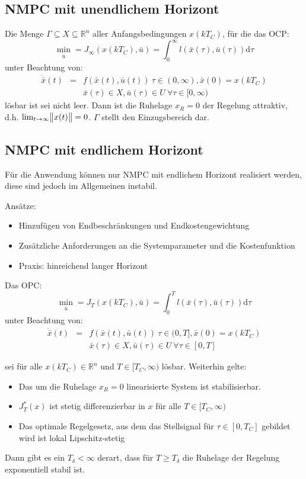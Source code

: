 \subsection{NMPC mit unendlichem Horizont}
Die Menge $\Gamma \subseteq X \subseteq \mathbb{R}^n$ aller Anfangsbedingungen $x(kT_C)$,
für die das OCP:
\begin{equation}
    \min_{\bar{u}} = J_\infty(x(k T_C), \bar{u}) = \int_0^\infty l(\bar{x}(\tau), \bar{u}(\tau)) \text{d}\tau
\end{equation}
unter Beachtung von:
\begin{eqnarray}
    \dot{\bar{x}}(t) &=& f(\bar{x}(t), \bar{u}(t))\ \tau \in (0, \infty), \bar{x}(0)=x(k T_C) \\
    &&\bar{x}(\tau) \in X, \bar{u}(\tau) \in U\ \forall \tau \in [0, \infty)
\end{eqnarray}
lösbar ist sei nicht leer. Dann ist die Ruhelage $x_R=0$ der Regelung attraktiv, d.h.
$\lim_{t \to \infty} \norm{x(t)} = 0$. $\Gamma$ stellt den Einzugsbereich dar.

\subsection{NMPC mit endlichem Horizont}
Für die Anwendung können nur NMPC mit endlichem Horizont realisiert werden, diese sind
jedoch im Allgemeinen instabil.

Ansätze:
\begin{itemize}
    \item
        Hinzufügen von Endbeschränkungen und Endkostengewichtung
    \item
        Zusätzliche Anforderungen an die Systemparameter und die Kostenfunktion
    \item
        Praxis: hinreichend langer Horizont
\end{itemize}

Das OPC: 
\begin{equation}
    \min_{\bar{u}} = J_T(x(k T_C), \bar{u}) = \int_0^T l(\bar{x}(\tau), \bar{u}(\tau)) \text{d}\tau
\end{equation}
unter Beachtung von:
\begin{eqnarray}
    \dot{\bar{x}}(t) &=& f(\bar{x}(t), \bar{u}(t))\ \tau \in (0, T], \bar{x}(0)=x(k T_C) \\
    &&\bar{x}(\tau) \in X, \bar{u}(\tau) \in U\ \forall \tau \in [0, T]
\end{eqnarray}

sei für alle $x(k T_C) \in \mathbb{R}^n$ und $T \in [T_C, \infty)$ lösbar. Weiterhin
gelte:
\begin{itemize}
    \item 
        Das um die Ruhelage $x_R=0$ linearisierte System ist stabilisierbar.
    \item
        $J_T^* (x)$ ist stetig differenzierbar in $x$ für alle $T \in [T_C, \infty)$
    \item
        Das optimale Regelgesetz, aus dem das Stellsignal für $\tau \in [0, T_C]$ gebildet
        wird ist lokal Lipschitz-stetig
\end{itemize}
Dann gibt es ein $T_\delta < \infty$ derart, dass für $T \geq T_\delta$ die Ruhelage der
Regelung exponentiell stabil ist.
